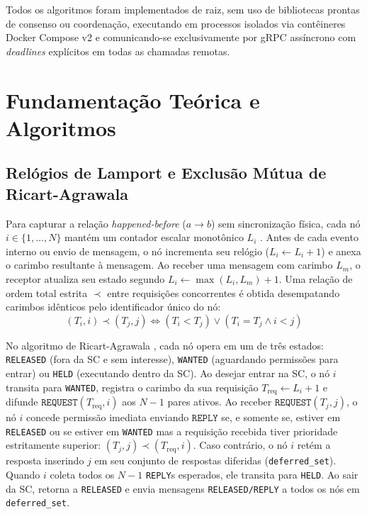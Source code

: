 \documentclass[conference,10pt]{IEEEtran}
\begin{document}
Todos os algoritmos foram implementados de raiz, sem uso de bibliotecas prontas de consenso ou coordenação, executando em processos isolados via contêineres Docker Compose v2 e comunicando-se exclusivamente por gRPC assíncrono com \textit{deadlines} explícitos em todas as chamadas remotas.

\section{Fundamentação Teórica e Algoritmos}

\subsection{Relógios de Lamport e Exclusão Mútua de Ricart-Agrawala}

Para capturar a relação \textit{happened-before} ($a \rightarrow b$) sem sincronização física, cada nó $i \in \{1, \dots, N\}$ mantém um contador escalar monotônico $L_i$ \cite{lamport1978}. Antes de cada evento interno ou envio de mensagem, o nó incrementa seu relógio ($L_i \leftarrow L_i + 1$) e anexa o carimbo resultante à mensagem. Ao receber uma mensagem com carimbo $L_m$, o receptor atualiza seu estado segundo $L_i \leftarrow \max(L_i, L_m) + 1$. Uma relação de ordem total estrita $\prec$ entre requisições concorrentes é obtida desempatando carimbos idênticos pelo identificador único do nó:
\begin{equation}
(T_i, i) \prec (T_j, j) \iff (T_i < T_j) \lor (T_i = T_j \land i < j)
\label{eq:lamport_order}
\end{equation}

No algoritmo de Ricart-Agrawala \cite{ricart1981}, cada nó opera em um de três estados: \texttt{RELEASED} (fora da SC e sem interesse), \texttt{WANTED} (aguardando permissões para entrar) ou \texttt{HELD} (executando dentro da SC). Ao desejar entrar na SC, o nó $i$ transita para \texttt{WANTED}, registra o carimbo da sua requisição $T_{\text{req}} \leftarrow L_i + 1$ e difunde $\texttt{REQUEST}(T_{\text{req}}, i)$ aos $N-1$ pares ativos. Ao receber $\texttt{REQUEST}(T_j, j)$, o nó $i$ concede permissão imediata enviando $\texttt{REPLY}$ se, e somente se, estiver em \texttt{RELEASED} ou se estiver em \texttt{WANTED} mas a requisição recebida tiver prioridade estritamente superior: $(T_j, j) \prec (T_{\text{req}}, i)$. Caso contrário, o nó $i$ retém a resposta inserindo $j$ em seu conjunto de respostas diferidas (\texttt{deferred\_set}). Quando $i$ coleta todos os $N-1$ \texttt{REPLY}s esperados, ele transita para \texttt{HELD}. Ao sair da SC, retorna a \texttt{RELEASED} e envia mensagens \texttt{RELEASED/REPLY} a todos os nós em \texttt{deferred\_set}.
\end{document}
